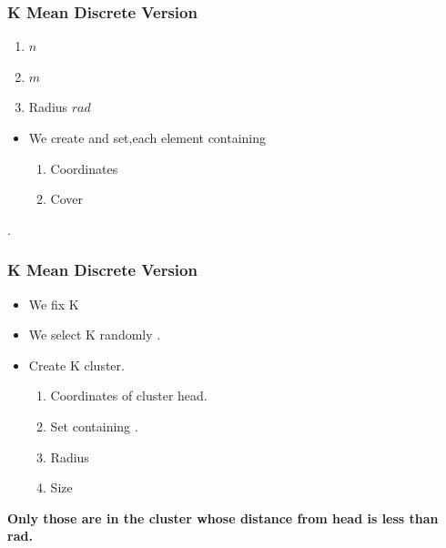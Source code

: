 \documentclass[blue]{beamer}
\begin{document}



\begin{frame}
 \frametitle{K Mean Discrete Version}
 {}
  \begin{enumerate}
      \item $n$ {\color{red}{Red Points}}
      \item $m$ {\color{blue}{Blue Points}}
      \item Radius $rad$ 
  \end{enumerate}
 {}
 \begin{itemize}
  \item We create {\color{red}{red point}} and {\color{blue}{blue point}} set,each element containing  
   \begin{enumerate}
    \item Coordinates
    \item Cover
   \end{enumerate}
 \end{itemize}
{}.
\end{frame}

\begin{frame}
\frametitle{K Mean Discrete Version}
 \begin{itemize}
  \item We fix K
  \item We select K randomly {\color{blue}{blue points}}.
  \item Create K cluster.\
    \begin{enumerate}
     \item Coordinates of cluster head.
     \item Set containing {\color{red}{red points}}.
     \item Radius
     \item Size
    \end{enumerate}
\end{itemize}
\textbf{Only those {\color{red}{red points}} are in the cluster whose distance from head is less than rad.}
\end{frame}
\end{document}
